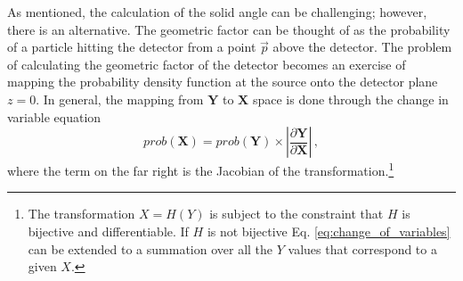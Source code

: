 As mentioned, the calculation of the solid angle can be challenging; however, there is an alternative.
The geometric factor can be thought of as the probability of a particle hitting the detector from a point $\vec{p}$ above the detector. The problem of calculating the geometric factor of the detector becomes an exercise of mapping the probability density function at the source onto the detector plane $z=0$. In general, the mapping from $\mathbf{Y}$ to $\mathbf{X}$ space is done through the change in variable equation 
\begin{equation}
\label{eq:change_of_variables}
prob(\mathbf{X}) = prob(\mathbf{Y}) \times \left | \frac{\partial \mathbf{Y}}{\partial \mathbf{X}} \right|\,,
\end{equation}
where the term on the far right is the Jacobian of the transformation.\footnote{The transformation $X = H(Y)$ is subject to the constraint that $H$ is bijective and differentiable. If $H$ is not bijective Eq. \ref {eq:change_of_variables} can be extended to a summation over all the $Y$ values that correspond to a given $X$.}

